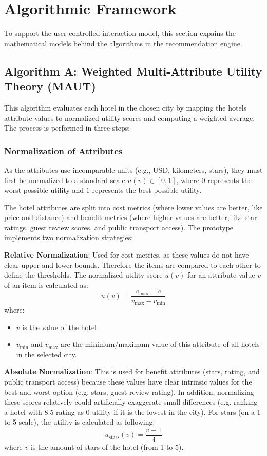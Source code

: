 \documentclass[acmlarge]{acmart}
\begin{document}
\section{Algorithmic Framework}\label{sec:algorithmic_framework}
To support the user-controlled interaction model, this section expains the mathematical models behind the algorithms in the recommendation engine.

\subsection{Algorithm A: Weighted Multi-Attribute Utility Theory (MAUT)}
This algorithm evaluates each hotel in the chosen city by mapping the hotels attribute values to normalized utility scores and computing a weighted average. The process is performed in three steps:

\subsubsection{Normalization of Attributes}
As the attributes use incomparable units (e.g., USD, kilometers, stars), they must first be normalized to a standard scale $u(v) \in [0, 1]$, where $0$ represents the worst possible utility and $1$ represents the best possible utility.

The hotel attributes are split into cost metrics (where lower values are better, like price and distance) and benefit metrics (where higher values are better, like star ratings, guest review scores, and public transport access). The prototype implements two normalization strategies:

\textbf{Relative Normalization}: Used for cost metrics, as these values do not have clear upper and lower bounds. Therefore the items are compared to each other to define the thresholds. The normalized utility score $u(v)$ for an attribute value $v$ of an item is calculated as:
\begin{equation}\label{eq:norm_relative}
  u(v) = \frac{v_{\max} - v}{v_{\max} - v_{\min}}
\end{equation}
where:
\begin{itemize}
  \item $v$ is the value of the hotel
  \item $v_{\min}$ and $v_{\max}$ are the minimum/maximum value of this attribute of all hotels in the selected city.
\end{itemize}


\textbf{Absolute Normalization}: This is used for benefit attributes (stars, rating, and public transport access) because these values have clear intrinsic values for the best and worst option (e.g. stars, guest review rating). In addition, normalizing these scores relatively could artificially exaggerate small differences (e.g. ranking a hotel with 8.5 rating as 0 utility if it is the lowest in the city).
For stars (on a 1 to 5 scale), the utility is calculated as following:
\begin{equation}\label{eq:norm_stars}
  u_{\text{stars}}(v) = \frac{v - 1}{4}
\end{equation}
where $v$ is the amount of stars of the hotel (from 1 to 5).
\end{document}
